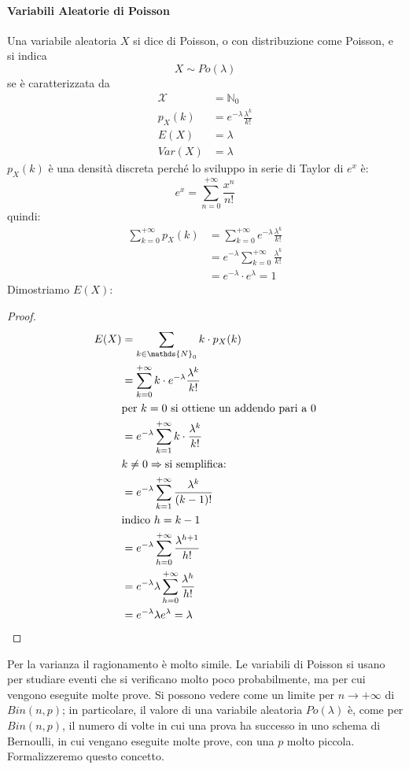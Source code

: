 \documentclass{article}
\theoremstyle{plain}
\theoremstyle{definition}
\theoremstyle{remark}
\begin{document}
\paragraph{Variabili Aleatorie di Poisson} %
\label{par:variabili_aleatorie_di_poisson}
Una variabile aleatoria $X$ si dice di Poisson, o con distribuzione come Poisson, e si indica
\begin{equation*}
	X\sim Po(\lambda)
\end{equation*}
se è caratterizzata da
\begin{align*}
	\mathcal{X}&=\mathds{N}_0\\
	p_X(k)&=e^{-\lambda}\frac{\lambda^k}{k!}\\
	E(X)&=\lambda\\
	Var(X)&=\lambda
\end{align*}
$p_X(k)$ è una densità discreta perché lo sviluppo in serie di Taylor di $e^x$ è:
\begin{equation*}
	e^x=\sum_{n=0}^{+\infty}\frac{x^n}{n!}
\end{equation*}
quindi:
\begin{align*}
	\sum_{k=0}^{+\infty}p_X(k)&=\sum_{k=0}^{+\infty}e^{-\lambda}\frac{\lambda^k}{k!}\\
	&=e^{-\lambda}\sum_{k=0}^{+\infty}\frac{\lambda^k}{k!}\\
	&=e^{-\lambda}\cdot e^{\lambda}=1
\end{align*}
Dimostriamo $E(X)$:
\begin{proof}
	\begin{align*}
		E(X)&=\sum_{k\in\mathds{N}_0}k\cdot p_X(k)\\
		&=\sum_{k=0}^{+\infty}k\cdot e^{-\lambda}\frac{\lambda^k}{k!}\\
		&\text{per }k=0\text{ si ottiene un addendo pari a }0\\
		&=e^{-\lambda}\sum_{k=1}^{+\infty}k\cdot\frac{\lambda^k}{k!}\\
		&k\neq0\Rightarrow\text{si semplifica:}\\
		&=e^{-\lambda}\sum_{k=1}^{+\infty}\frac{\lambda^k}{(k-1)!}\\
		&\text{indico }h=k-1\\
		&=e^{-\lambda}\sum_{h=0}^{+\infty}\frac{\lambda^{h+1}}{h!}\\
		&=e^{-\lambda}\lambda\sum_{h=0}^{+\infty}\frac{\lambda^h}{h!}\\
		&=e^{-\lambda}\lambda e^{\lambda}=\lambda\qedhere
	\end{align*}
\end{proof}
Per la varianza il ragionamento è molto simile. Le variabili di Poisson si usano per studiare eventi che si verificano molto poco probabilmente, ma per cui vengono eseguite molte prove. Si possono vedere come un limite per $n\to+\infty$ di $Bin(n,p)$; in particolare, il valore di una variabile aleatoria $Po(\lambda)$ è, come per $Bin(n,p)$, il numero di volte in cui una prova ha successo in uno schema di Bernoulli, in cui vengano eseguite molte prove, con una $p$ molto piccola. Formalizzeremo questo concetto.
\end{document}
